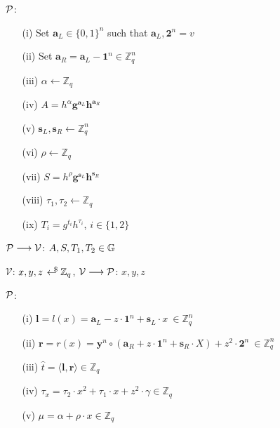 \begin{mdframed}
\begin{itemize}[itemsep=4pt]
    \vspace{-4pt}
    \item[] $\P$:\vspace{-4pt}
    \begin{enumerate}[itemsep=5pt]
        \item[(i)] Set $\textbf{a}_L \in \{0,1\}^n$ such that $\textbf{a}_L, \textbf{2}^n = v$
        \item[(ii)] Set $\textbf{a}_R = \textbf{a}_L - \textbf{1}^n \in \mathbb{Z}_q^n$
        \item[(iii)] $\alpha \leftarrow \mathbb{Z}_q$ 
        \item[(iv)] $A = h^{\alpha}\textbf{g}^{\textbf{a}_L}\textbf{h}^{\textbf{a}_R}$
        \item[(v)] $\textbf{s}_L, \textbf{s}_R \leftarrow \mathbb{Z}_q^n$
        \item[(vi)] $\rho \leftarrow \mathbb{Z}_q$
        \item[(vii)] $S = h^{\rho}\textbf{g}^{\textbf{s}_L}\textbf{h}^{\textbf{s}_R}$ 
        \item[(viii)] $\tau_1, \tau_2 \leftarrow \mathbb{Z}_q$
        \item[(ix)] $T_i = g^{t_i}h^{\tau_i}$, $i \in \{ 1,2\}$ 
    \end{enumerate}

    \item[] $\mathcal{P} \longrightarrow \V$: $A, S, T_1, T_2 \in \G$ 

    \item[] $\mathcal{V}$: $x,y,z \rgen \Z_q$, $\mathcal{V} \longrightarrow \P$: $x,y,z$


    \item[] $\P$:\vspace{-4pt}
    \begin{enumerate}[itemsep=5pt]
        \item[(i)] $\textbf{l} = l(x) = \textbf{a}_L - z\cdot \textbf{1}^n + \textbf{s}_L \cdot x \ \in \mathbb{Z}_q^n$
        \item[(ii)] $\textbf{r} = r(x) = \textbf{y}^n \circ (\textbf{a}_R + z\cdot \textbf{1}^n + \textbf{s}_R\cdot X) + z^2 \cdot \textbf{2}^n \ \in \mathbb{Z}_q^n$
        \item[(iii)] $\hat{t} = \langle \textbf{l}, \textbf{r}\rangle \in \mathbb{Z}_q$
        \item[(iv)] $\tau_x = \tau_2\cdot x^2 + \tau_1\cdot x + z^2\cdot \gamma \in \mathbb{Z}_q$
        \item[(v)] $\mu = \alpha + \rho \cdot x \in \mathbb{Z}_q$
    \end{enumerate}


\end{itemize}
\end{mdframed}
